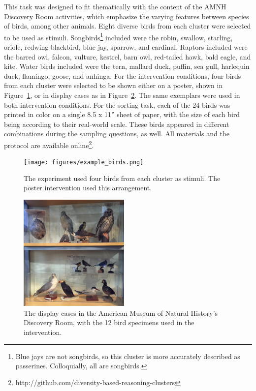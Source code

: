 \documentclass[10pt,letterpaper]{article}
\begin{document}
This task was designed to fit thematically with the content of the AMNH Discovery Room activities, which emphasize the varying features between species of birds, among other animals. 
Eight diverse birds from each cluster were selected to be used as stimuli. Songbirds\footnote{Blue jays are not songbirds, so this cluster is more accurately described as passerines. Colloquially, all are songbirds.} included were the robin, swallow, starling, oriole, redwing blackbird, blue jay, sparrow, and cardinal. 
Raptors included were the barred owl, falcon, vulture, kestrel, barn owl, red-tailed hawk, bald eagle, and kite. 
Water birds included were the tern, mallard duck, puffin, sea gull, harlequin duck, flamingo, goose, and anhinga. 
For the intervention conditions, four birds from each cluster were selected to be shown either on a poster, shown in Figure~\ref{fig:example_birds}, or in display cases as in  Figure~\ref{fig:display_cases}. 
The same exemplars were used in both intervention conditions. For the sorting task, each of the 24 birds was printed in color on a single 8.5 x 11'' sheet of paper, with the size of each bird being according to their real-world scale. 
These birds appeared in different combinations during the sampling questions, as well.
All materials and the protocol are available online\footnote{http://github.com/diversity-based-reasoning-clusters}. 

\begin{figure}[h]
  \centering
  \texttt{[image: figures/example\_birds.png]}
  \caption{The experiment used four birds from each cluster as stimuli. The poster intervention used this arrangement.} 
  \label{fig:example_birds}
\end{figure} 

\begin{figure}[h]
  \centering
  \includegraphics[width=0.48\textwidth]{figures/display_cases}
  \caption{The display cases in the American Museum of Natural History's Discovery Room, with the 12 bird specimens used in the intervention.} 
  \label{fig:display_cases}
\end{figure} 
\end{document}
